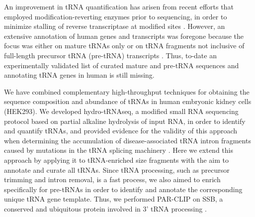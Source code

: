 \documentclass[12pt]{rockefeller}
\begin{document}
An improvement in tRNA quantification has arisen from recent efforts that employed modification-reverting enzymes prior to sequencing, in order to minimize stalling of reverse transcriptase at modified sites \cite{Cozen:2015ds} \cite{Zheng:2015dw}. However, an extensive annotation of human genes and transcripts was foregone because the focus was either on mature tRNAs only \cite{Zheng:2015dw} or on tRNA fragments not inclusive of full-length precursor tRNA (pre-tRNA) transcripts \cite{Cozen:2015ds}. Thus, to-date an experimentally validated list of curated mature and pre-tRNA sequences and annotating tRNA genes in human is still missing.

We have combined complementary high-throughput techniques for obtaining the sequence composition and abundance of tRNAs in human embryonic kidney cells (HEK293). We developed hydro-tRNAseq, a modified small RNA sequencing protocol based on partial alkaline hydrolysis of input RNA, in order to identify and quantify tRNAs, and provided evidence for the validity of this approach when determining the accumulation of disease-associated tRNA intron fragments caused by mutations in the tRNA splicing machinery \cite{Karaca:2014em}. Here we extend this approach by applying it to tRNA-enriched size fragments with the aim to annotate and curate all tRNAs. Since tRNA processing, such as precursor trimming and intron removal, is a fast process\cite{Foretek:2016ea}, we also aimed to enrich specifically for pre-tRNAs in order to identify and annotate the corresponding unique tRNA gene template. Thus, we performed PAR-CLIP on SSB, a conserved and ubiquitous protein involved in 3’ tRNA processing \cite{Bayfield:2009cx} \cite{Bayfield:2010cs} \cite{Stefano:1984wp}. 
\end{document}
